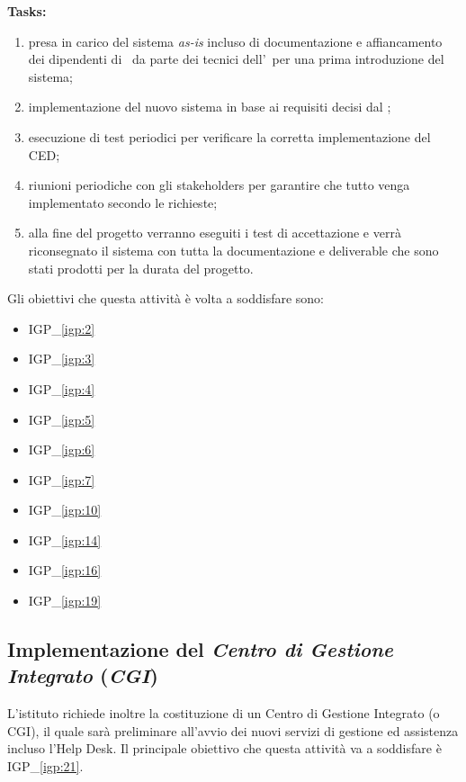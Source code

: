 		\textbf{Tasks:}
		\begin{enumerate}[noitemsep]
			\item presa in carico del sistema \textit{as-is} incluso di documentazione e affiancamento dei dipendenti di \azienda~da parte dei tecnici dell'\istituto~per una prima introduzione del sistema;
			\item implementazione del nuovo sistema in base ai requisiti decisi dal \proponente;
			\item esecuzione di test periodici per verificare la corretta implementazione del CED;
			\item riunioni periodiche con gli stakeholders per garantire che tutto venga implementato secondo le richieste;
			\item alla fine del progetto verranno eseguiti i test di accettazione e verrà riconsegnato il sistema con tutta la documentazione e deliverable che sono stati prodotti per la durata del progetto.
		\end{enumerate}

		Gli obiettivi che questa attività è volta a soddisfare sono:
		\begin{itemize}[noitemsep]
			\renewcommand\labelitemi{--}
			\item {\color{pantone}IGP\_\ref{igp:2}}
			\item {\color{pantone}IGP\_\ref{igp:3}}
			\item {\color{pantone}IGP\_\ref{igp:4}}
			\item {\color{pantone}IGP\_\ref{igp:5}}
			\item {\color{pantone}IGP\_\ref{igp:6}}
			\item {\color{pantone}IGP\_\ref{igp:7}}
			\item {\color{pantone}IGP\_\ref{igp:10}}
			\item {\color{pantone}IGP\_\ref{igp:14}}
			\item {\color{pantone}IGP\_\ref{igp:16}}
			\item {\color{pantone}IGP\_\ref{igp:19}}
		\end{itemize}

	\newpage
	\subsection{Implementazione del \textit{Centro di Gestione Integrato} (\textit{CGI})}
	
		L'istituto richiede inoltre la costituzione di un Centro di Gestione Integrato (o CGI), il quale sarà preliminare all'avvio dei nuovi servizi di gestione ed assistenza incluso l'Help Desk.
		Il principale obiettivo che questa attività va a soddisfare è {\color{pantone}IGP\_\ref{igp:21}}.
		
